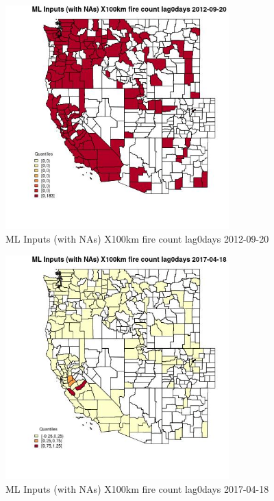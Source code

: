 \begin{figure} 
\centering  
\includegraphics[width=0.77\textwidth]{Code_Outputs/Report_ML_input_PM25_Step4_part_e_de_duplicated_aves_compiled_2019-05-14wNAs_CountyX100km_fire_count_lag0daysMean2012-09-20_2012-09-20.jpg} 
\caption{\label{fig:Report_ML_input_PM25_Step4_part_e_de_duplicated_aves_compiled_2019-05-14wNAsCountyX100km_fire_count_lag0daysMean2012-09-20_2012-09-20}ML Inputs (with NAs) X100km fire count lag0days 2012-09-20} 
\end{figure} 
 

\begin{figure} 
\centering  
\includegraphics[width=0.77\textwidth]{Code_Outputs/Report_ML_input_PM25_Step4_part_e_de_duplicated_aves_compiled_2019-05-14wNAs_CountyX100km_fire_count_lag0daysMean2017-04-18_2017-04-18.jpg} 
\caption{\label{fig:Report_ML_input_PM25_Step4_part_e_de_duplicated_aves_compiled_2019-05-14wNAsCountyX100km_fire_count_lag0daysMean2017-04-18_2017-04-18}ML Inputs (with NAs) X100km fire count lag0days 2017-04-18} 
\end{figure} 
 

